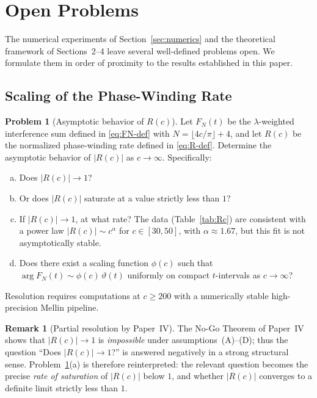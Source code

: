 \documentclass[12pt,a4paper]{amsart}
\theoremstyle{definition}
\newtheorem{problem}{Problem}[section]
\newtheorem{remark}[theorem]{Remark}
\begin{document}
\section{Open Problems}
\label{sec:open}

The numerical experiments of Section~\ref{sec:numerics} and the
theoretical framework of Sections~2--4 leave several well-defined
problems open. We formulate them in order of proximity to the
results established in this paper.

\subsection{Scaling of the Phase-Winding Rate}
\label{ssec:prob1}

\begin{problem}[Asymptotic behavior of $R(c)$]
\label{prob:Rc-scaling}
Let $F_N(t)$ be the $\lambda$-weighted interference sum defined
in \eqref{eq:FN-def} with $N = \lfloor 4c/\pi \rfloor + 4$,
and let $R(c)$ be the normalized phase-winding rate defined in
\eqref{eq:R-def}. Determine the asymptotic behavior of $|R(c)|$
as $c \to \infty$. Specifically:
\begin{enumerate}[(a)]
\item Does $|R(c)| \to 1$?
\item Or does $|R(c)|$ saturate at a value strictly less than $1$?
\item If $|R(c)| \to 1$, at what rate? The data
(Table~\ref{tab:Rc}) are consistent with a power law
$|R(c)| \sim c^\alpha$ for $c \in [30, 50]$, with
$\alpha \approx 1.67$, but this fit is not asymptotically
stable.
\item Does there exist a scaling function $\phi(c)$ such that
$\arg F_N(t) \sim \phi(c)\,\vartheta(t)$ uniformly on compact
$t$-intervals as $c \to \infty$?
\end{enumerate}
Resolution requires computations at $c \geq 200$ with a
numerically stable high-precision Mellin pipeline.
\end{problem}

\begin{remark}[Partial resolution by Paper~IV]
\label{rem:prob61-paperIV}
The No-Go Theorem of Paper~IV \cite{PaperIV} shows that $|R(c)| \to 1$
is \emph{impossible} under assumptions~(A)--(D); thus the question
``Does $|R(c)| \to 1$?'' is answered negatively in a strong structural
sense. Problem~\ref{prob:Rc-scaling}(a) is therefore reinterpreted:
the relevant question becomes the precise \emph{rate of saturation} of
$|R(c)|$ below $1$, and whether $|R(c)|$ converges to a definite limit
strictly less than $1$.
\end{remark}
\end{document}
